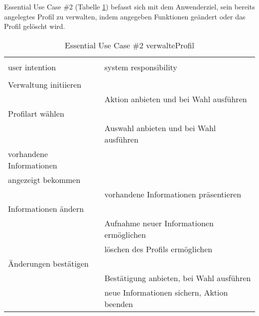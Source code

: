 Essential Use Case \#2 (Tabelle \ref{tab:profilverwalten}) befasst sich mit dem Anwenderziel, sein bereits angelegtes Profil zu verwalten, indem angegeben Funktionen geändert oder das Profil gelöscht wird.
\begin{table}[H]
\caption{Essential Use Case \#2 verwalteProfil }
\centering
\begin{tabular}{l l}
\\ [-0.5ex]

\hline\hline
\\ [-0.5ex]
user intention & system responsibility
\\ [1.5ex]
\hline
\\ [-0.5ex]
Verwaltung initiieren      &                                 \\[1ex]
                     & Aktion anbieten und bei Wahl ausführen     \\[1ex]
Profilart wählen        &                                 \\[1ex]
                     & Auswahl anbieten und bei Wahl ausführen  \\[1ex]             
vorhandene Informationen   &                                 \\[1ex]
angezeigt bekommen         &                                 \\[1ex]
                     & vorhandene Informationen präsentieren      \\[1ex] 
Informationen ändern       &                                 \\[1ex] 
                     & Aufnahme neuer Informationen ermöglichen    \\[1ex]
                     & löschen des Profils ermöglichen          \\[1ex]
Änderungen bestätigen      &                                 \\[1ex]
                     & Bestätigung anbieten, bei Wahl ausführen   \\[1ex]
                     & neue Informationen sichern, Aktion beenden \\[1ex]

\hline
\end{tabular}
\label{tab:profilverwalten}
\end{table}

